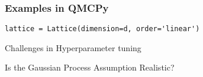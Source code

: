 \documentclass[11pt,compress,xcolor={usenames,dvipsnames},aspectratio=169]{beamer}
\begin{document}
\begin{frame}[fragile]\frametitle{Examples in QMCPy}

\noindent\begin{lstlisting}[style=Python]
lattice = Lattice(dimension=d, order='linear')
\end{lstlisting}

\end{frame}


\begin{frame}{Challenges in Hyperparameter tuning}
	
\end{frame}

\begin{frame}{Is the Gaussian Process Assumption Realistic?}
	
\end{frame}







\thankyouframe

\printbibliography

	
\end{document}
